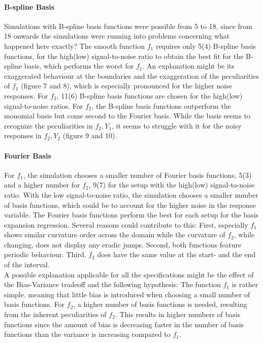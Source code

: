 \documentclass[11pt,twoside,a4paper]{article}
\begin{document}
	\paragraph{B-spline Basis}
	Simulations with B-spline basis functions were possible from 5 to 18, since from 18 onwards the simulations were running into problems concerning {\color{green} what happened here exactly?}
	The smooth function $f_1$ requires only 5(4) B-spline basis functions, for the high(low) signal-to-noise ratio to obtain the best fit for the B-spline basis, which performs the worst for $f_1$. An explanation might be its exaggerated behaviour at the boundaries and the exaggeration of the peculiarities of $f_1$ (figure 7 and 8), which is especially pronounced for the higher noise responses. For $f_2$, 11(6) B-spline basis functions are chosen for the high(low) signal-to-noise ratios. For $f_2$, the B-spline basis functions outperform the monomial basis but come second to the Fourier basis. While the basis seems to recognize the peculiarities in $f_2,Y_1$, it seems to struggle with it for the noisy responses in $f_2,Y_2$ (figure 9 and 10).
	
	\paragraph{Fourier Basis}
	For $f_1$, the simulation chooses a smaller number of Fourier basis functions, 5(3) and a higher number for $f_2$, 9(7) for the setup with the high(low) signal-to-noise ratio. With the low signal-to-noise ratio, the simulation chooses a smaller number of basis functions, which could be to account for the higher noise in the response variable. The Fourier basis functions perform the best for each setup for the basis expansion regression. Several reasons could contribute to this: First, especially $f_1$ shows similar curvature order across the domain while the curvature of $f_2$, while changing, does not display any eradic jumps. Second, both functions feature periodic behaviour. Third, $f_2$ does have the same value at the start- and the end of the interval.	\\
	
	A possible explanation applicable for all the specifications might be the effect of the Bias-Variance tradeoff and the following hypothesis: The function $f_1$ is rather simple. meaning that little bias is introduced when choosing a small number of basis functions. For $f_2$, a higher number of basis functions is needed, resulting from the inherent peculiarities of $f_2$. This results in higher numbers of basis functions since the amount of bias is decreasing faster in the number of basis functions than the variance is increasing compared to $f_1$. 
\end{document}
